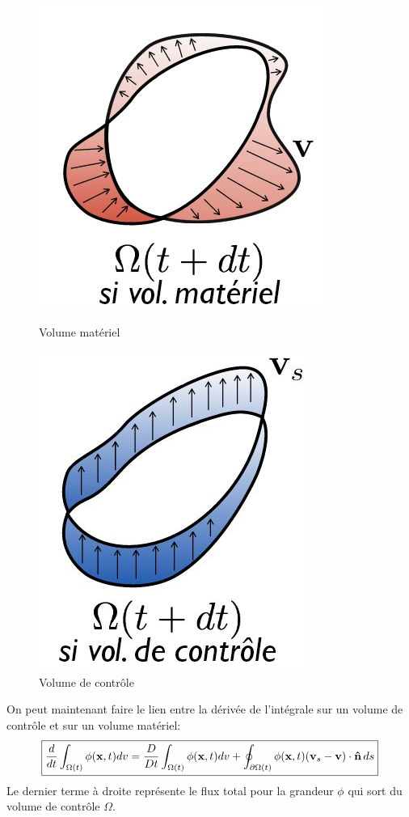\begin{figure}
    \begin{minipage}[b]{0.4\linewidth}
        \includegraphics[scale=0.5]{volmateriel.jpg}
        \caption{Volume matériel}
        \label{fig:volmat}
    \end{minipage}\hfill
    \begin{minipage}[b]{0.4\linewidth}
         \includegraphics[scale=0.5]{volcontrole.jpg}
         \caption{Volume de contrôle}
         \label{fig:volcont}
    \end{minipage}
\end{figure}

On peut maintenant faire le lien entre la dérivée de l'intégrale sur un volume de contrôle et sur un volume matériel:
\begin{equation}
\label{comparaison_mat_cont}
\boxed{\frac{d}{dt}\int_{\Omega (t)}\phi(\textbf{x},t)dv=\frac{D}{Dt}\int_{\Omega (t)}\phi(\textbf{x},t)dv+\oint_{\partial \Omega (t)}\phi(\textbf{x},t)(\textbf{v}_s-\textbf{v})\cdot \textbf{\^n}\,ds}
\end{equation}
Le dernier terme à droite représente le flux total pour la grandeur $\phi$ qui sort du volume de contrôle $\Omega$.

